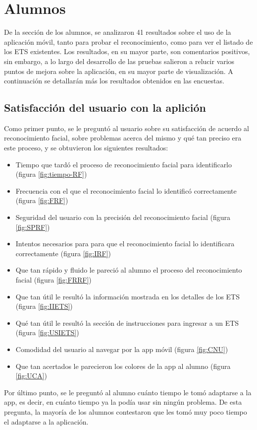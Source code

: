 \section{Alumnos}
De la sección de los alumnos, se analizaron 41 resultados sobre el uso de la aplicación móvil, tanto para probar el reconocimiento, como para ver el listado de los ETS existentes. 
Los resultados, en su mayor parte, son comentarios positivos, sin embargo, a lo largo del desarrollo de las pruebas salieron a relucir varios puntos de mejora sobre la aplicación, en su mayor parte de visualización. A continuación se detallarán más los resultados obtenidos en las encuestas.

\subsection{Satisfacción del usuario con la aplición}
Como primer punto, se le preguntó al usuario sobre su satisfacción de acuerdo al reconocimiento facial, sobre problemas acerca del mismo y qué tan preciso era este proceso, y se obtuvieron los siguientes resultados:
\begin{itemize}
	\item Tiempo que tardó el proceso de reconocimiento facial para identificarlo (figura \ref{fig:tiempo-RF})
	\item Frecuencia con el que el reconocimiento facial lo identificó correctamente (figura \ref{fig:FRF})
	\item Seguridad del usuario con la precisión del reconocimiento facial (figura \ref{fig:SPRF})
	\item Intentos necesarios para para que el reconocimiento facial lo identificara correctamente (figura \ref{fig:IRF})
	\item Que tan rápido y fluido le pareció al alumno el proceso del reconocimiento facial (figura \ref{fig:FRRF})
	\item Que tan útil le resultó la información mostrada en los detalles de los ETS (figura \ref{fig:IIETS})
	\item Qué tan útil le resultó la sección de instrucciones para ingresar a un ETS (figura \ref{fig:USIETS})
	\item Comodidad del usuario al navegar por la app móvil (figura \ref{fig:CNU})
	\item Que tan acertados le parecieron los colores de la app al alumno (figura \ref{fig:UCA})
\end{itemize} 

Por último punto, se le preguntó al alumno cuánto tiempo le tomó adaptarse a la app, es decir, en cuánto tiempo ya la podía usar sin ningún problema. De esta pregunta, la mayoría de los alumnos contestaron que les tomó muy poco tiempo el adaptarse a la aplicación.

